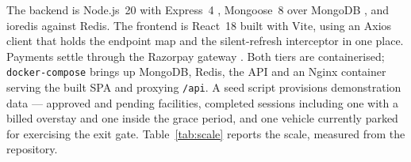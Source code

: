 \documentclass[journal,onecolumn,11pt]{IEEEtran}
\begin{document}
The backend is Node.js~20 with Express~4 \cite{expressdocs}, Mongoose~8 over
MongoDB \cite{mongodocs}, and ioredis against Redis. The frontend is React~18
\cite{reactdocs} built with Vite, using an Axios client that holds the endpoint
map and the silent-refresh interceptor in one place. Payments settle through
the Razorpay gateway \cite{razorpaydocs}. Both tiers are containerised;
\texttt{docker-compose} brings up MongoDB, Redis, the API and an Nginx
container \cite{nginxdocs} serving the built SPA and proxying \texttt{/api}. A
seed script provisions demonstration data --- approved and pending facilities,
completed sessions including one with a billed overstay and one inside the
grace period, and one vehicle currently parked for exercising the exit gate.
Table~\ref{tab:scale} reports the scale, measured from the repository.
\end{document}
